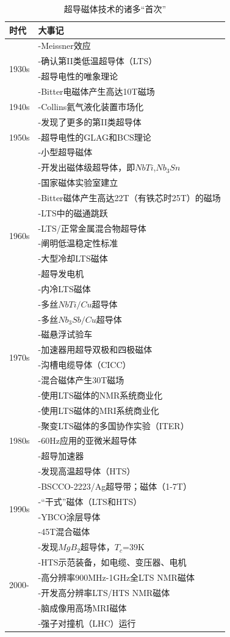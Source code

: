 \begin{table}[htbp]\small
  \centering
  \caption{超导磁体技术的诸多“首次”} \label{first event}

\begin{tabular}{ |l||l|}
\hline
时代 & 大事记  \\ \hline
\multirow{4}{*}{1930s} & -Meissner效应 \\
 & -确认第II类低温超导体（LTS）\\
 & -超导电性的唯象理论 \\
 & -Bitter电磁体产生高达10T磁场 \\
 \hline
 1940s & -Collins氦气液化装置市场化\\
 \hline
\multirow{3}{*}{1950s} & -发现了更多的第II类超导体 \\
 & -超导电性的GLAG和BCS理论\\
 & -小型超导磁体 \\
 \hline
 \multirow{10}{*}{1960s} & -开发出磁体级超导体，即$NbTi$,$Nb_3Sn$ \\
 & -国家磁体实验室建立\\
 & -Bitter磁体产生高达22T（有铁芯时25T）的磁场\\
 & -LTS中的磁通跳跃\\
 & -LTS/正常金属混合物超导体\\
 & -阐明低温稳定性标准\\
 & -大型冷却LTS磁体\\
 & -超导发电机\\
 & -内冷LTS磁体\\
 & -多丝$NbTi/Cu$超导体\\
 \hline
 \multirow{6}{*}{1970s} & -多丝$Nb_3Sb/Cu$超导体 \\
 & -磁悬浮试验车\\
 & -加速器用超导双极和四极磁体 \\
 & -沟槽电缆导体（CICC）\\
 & -混合磁体产生30T磁场\\
 & -使用LTS磁体的NMR系统商业化\\
 \hline
  \multirow{5}{*}{1980s} & -使用LTS磁体的MRI系统商业化 \\
 & -聚变LTS磁体的多国协作实验（ITER）\\
 & -60Hz应用的亚微米超导体\\
 & -超导加速器\\
 & -发现高温超导体（HTS）\\
 \hline
   \multirow{4}{*}{1990s} & -BSCCO-2223/Ag超导带；磁体（1-7T） \\
 & -“干式”磁体（LTS和HTS）\\
 & -YBCO涂层导体\\
 & -45T混合磁体\\
 \hline
  \multirow{6}{*}{2000-} & -发现$MgB_2$超导体，$T_c$=39K \\
 & -HTS示范装备，如电缆、变压器、电机\\
 & -高分辨率900MHz-1GHz全LTS NMR磁体 \\
 & -开发高分辨率LTS/HTS NMR磁体\\
 & -脑成像用高场MRI磁体\\
 & -强子对撞机（LHC）运行\\
 \hline
\end{tabular}


\end{table}
